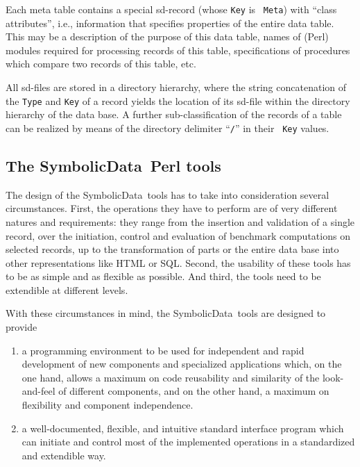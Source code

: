 \documentclass[11pt,a4paper]{article}
\newcommand{\SD}{{\sc Symbolic\-Data}}
\begin{document}
Each meta table contains a special sd-record (whose {\tt Key} is {\tt
Meta}) with ``class attributes'', i.e., information that specifies
properties of the entire data table. This may be a description of the
purpose of this data table, names of (Perl) modules required for
processing records of this table, specifications of procedures which
compare two records of this table, etc.
\medskip

All sd-files are stored in a directory hierarchy, where the string
concatenation of the {\tt Type} and {\tt Key} of a record yields the
location of its sd-file within the directory hierarchy of the data
base. A further sub-classification of the records of a table can be
realized by means of the directory delimiter ``{\tt /}'' in their {\tt
Key} values.

\subsection{The \SD\ Perl tools}

The design of the \SD\ tools has to take into consideration several
circumstances.  First, the operations they have to perform are of very
different natures and requirements: they range from the insertion and
validation of a single record, over the initiation, control and
evaluation of benchmark computations on selected records, up to the
transformation of parts or the entire data base into other
representations like HTML or SQL. Second, the usability of these tools
has to be as simple and as flexible as possible. And third, the tools
need to be extendible at different levels.

With these circumstances in mind, the \SD\ tools are designed to provide
\begin{enumerate}
\item a programming environment to be used for independent and rapid
  development of new components and specialized applications which, on
  the one hand, allows a maximum on code reusability and similarity of
  the look-and-feel of different components, and on the other hand, a
  maximum on flexibility and component independence.

\item a well-documented, flexible,
and intuitive standard interface program which can initiate and
control most of the implemented operations in a standardized and
extendible way.
\end{enumerate}
\end{document}
